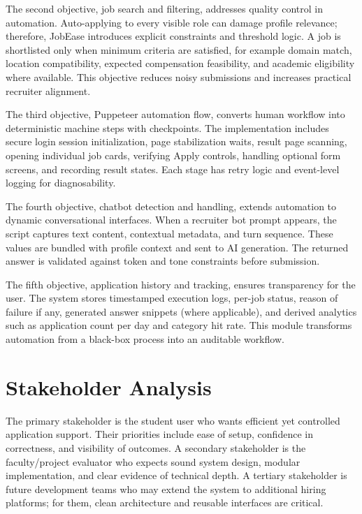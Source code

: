 \documentclass[12pt,a4paper,oneside]{report}
\begin{document}
The second objective, job search and filtering, addresses quality control in automation. Auto-applying to every visible role can damage profile relevance; therefore, JobEase introduces explicit constraints and threshold logic. A job is shortlisted only when minimum criteria are satisfied, for example domain match, location compatibility, expected compensation feasibility, and academic eligibility where available. This objective reduces noisy submissions and increases practical recruiter alignment.

The third objective, Puppeteer automation flow, converts human workflow into deterministic machine steps with checkpoints. The implementation includes secure login session initialization, page stabilization waits, result page scanning, opening individual job cards, verifying Apply controls, handling optional form screens, and recording result states. Each stage has retry logic and event-level logging for diagnosability.

The fourth objective, chatbot detection and handling, extends automation to dynamic conversational interfaces. When a recruiter bot prompt appears, the script captures text content, contextual metadata, and turn sequence. These values are bundled with profile context and sent to AI generation. The returned answer is validated against token and tone constraints before submission.

The fifth objective, application history and tracking, ensures transparency for the user. The system stores timestamped execution logs, per-job status, reason of failure if any, generated answer snippets (where applicable), and derived analytics such as application count per day and category hit rate. This module transforms automation from a black-box process into an auditable workflow.

\section{Stakeholder Analysis}
The primary stakeholder is the student user who wants efficient yet controlled application support. Their priorities include ease of setup, confidence in correctness, and visibility of outcomes. A secondary stakeholder is the faculty/project evaluator who expects sound system design, modular implementation, and clear evidence of technical depth. A tertiary stakeholder is future development teams who may extend the system to additional hiring platforms; for them, clean architecture and reusable interfaces are critical.
\end{document}

